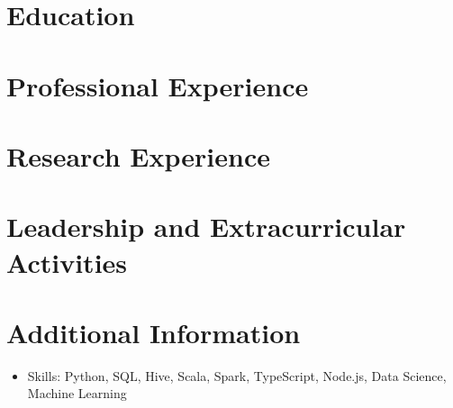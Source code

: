 \documentclass{resumeEN}
\begin{document}
\section{Education}

\pennmaster
\thuundergrad
\umnexchange

\section{Professional Experience}

\msra
\bytedance
\continental
\summitview

\section{Research Experience}

\ryanresearch
\umnresearch
\fifaresearch

\section{Leadership and Extracurricular Activities}

\eydatascience
\cnkibibtex
\cydp
\tkd
\semtech

\section{Additional Information}

\vspace{0.618ex}
\begin{itemize}
\item Skills: Python, SQL, Hive, Scala, Spark, TypeScript, Node.js, Data Science, Machine Learning
\end{itemize}
\end{document}
